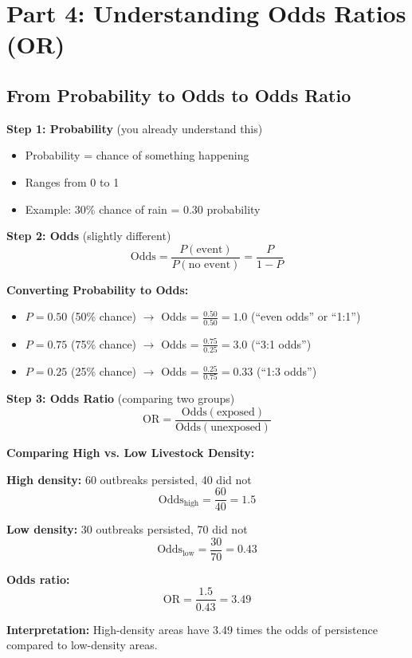 \documentclass[11pt,a4paper]{article}
\begin{document}
\section{Part 4: Understanding Odds Ratios (OR)}

\subsection{From Probability to Odds to Odds Ratio}

\textbf{Step 1: Probability} (you already understand this)
\begin{itemize}
    \item Probability = chance of something happening
    \item Ranges from 0 to 1
    \item Example: 30\% chance of rain = 0.30 probability
\end{itemize}

\textbf{Step 2: Odds} (slightly different)
\begin{equation}
\text{Odds} = \frac{P(\text{event})}{P(\text{no event})} = \frac{P}{1-P}
\end{equation}

\begin{example}
\textbf{Converting Probability to Odds:}
\begin{itemize}
    \item $P = 0.50$ (50\% chance) $\rightarrow$ Odds = $\frac{0.50}{0.50} = 1.0$ (``even odds'' or ``1:1'')
    \item $P = 0.75$ (75\% chance) $\rightarrow$ Odds = $\frac{0.75}{0.25} = 3.0$ (``3:1 odds'')
    \item $P = 0.25$ (25\% chance) $\rightarrow$ Odds = $\frac{0.25}{0.75} = 0.33$ (``1:3 odds'')
\end{itemize}
\end{example}

\textbf{Step 3: Odds Ratio} (comparing two groups)
\begin{equation}
\text{OR} = \frac{\text{Odds}(\text{exposed})}{\text{Odds}(\text{unexposed})}
\end{equation}

\begin{example}
\textbf{Comparing High vs. Low Livestock Density:}

\textbf{High density:} 60 outbreaks persisted, 40 did not
\[
\text{Odds}_{\text{high}} = \frac{60}{40} = 1.5
\]

\textbf{Low density:} 30 outbreaks persisted, 70 did not
\[
\text{Odds}_{\text{low}} = \frac{30}{70} = 0.43
\]

\textbf{Odds ratio:}
\[
\text{OR} = \frac{1.5}{0.43} = 3.49
\]

\textbf{Interpretation:} High-density areas have 3.49 times the odds of persistence compared to low-density areas.
\end{example}
\end{document}
